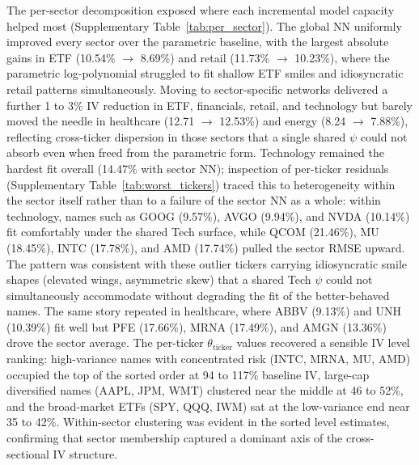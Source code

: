 The per-sector decomposition exposed where each incremental model capacity helped most (Supplementary Table~\ref{tab:per_sector}). The global NN uniformly improved every sector over the parametric baseline, with the largest absolute gains in ETF (10.54\% $\to$ 8.69\%) and retail (11.73\% $\to$ 10.23\%), where the parametric log-polynomial struggled to fit shallow ETF smiles and idiosyncratic retail patterns simultaneously. Moving to sector-specific networks delivered a further 1 to 3\% IV reduction in ETF, financials, retail, and technology but barely moved the needle in healthcare (12.71 $\to$ 12.53\%) and energy (8.24 $\to$ 7.88\%), reflecting cross-ticker dispersion in those sectors that a single shared $\psi$ could not absorb even when freed from the parametric form. Technology remained the hardest fit overall (14.47\% with sector NN); inspection of per-ticker residuals (Supplementary Table~\ref{tab:worst_tickers}) traced this to heterogeneity within the sector itself rather than to a failure of the sector NN as a whole: within technology, names such as GOOG (9.57\%), AVGO (9.94\%), and NVDA (10.14\%) fit comfortably under the shared Tech surface, while QCOM (21.46\%), MU (18.45\%), INTC (17.78\%), and AMD (17.74\%) pulled the sector RMSE upward. The pattern was consistent with these outlier tickers carrying idiosyncratic smile shapes (elevated wings, asymmetric skew) that a shared Tech $\psi$ could not simultaneously accommodate without degrading the fit of the better-behaved names. The same story repeated in healthcare, where ABBV (9.13\%) and UNH (10.39\%) fit well but PFE (17.66\%), MRNA (17.49\%), and AMGN (13.36\%) drove the sector average. The per-ticker $\theta_{\text{ticker}}$ values recovered a sensible IV level ranking: high-variance names with concentrated risk (INTC, MRNA, MU, AMD) occupied the top of the sorted order at 94 to 117\% baseline IV, large-cap diversified names (AAPL, JPM, WMT) clustered near the middle at 46 to 52\%, and the broad-market ETFs (SPY, QQQ, IWM) sat at the low-variance end near 35 to 42\%. Within-sector clustering was evident in the sorted level estimates, confirming that sector membership captured a dominant axis of the cross-sectional IV structure.

